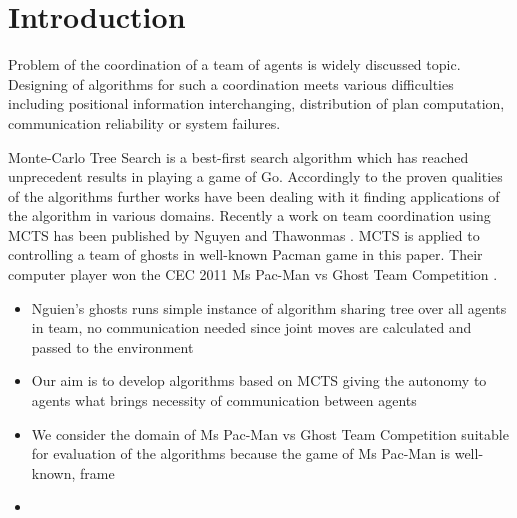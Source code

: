 \chapter*{Introduction}




Problem of the coordination of a team of agents is widely discussed topic.
Designing of algorithms for such a coordination meets various difficulties 
including positional information interchanging, distribution of plan computation, 
communication reliability or system failures.

Monte-Carlo Tree Search is a best-first search algorithm which has
reached unprecedent results in playing a game of Go.
Accordingly to the proven qualities of the algorithms further works have
been dealing with it finding applications of the algorithm in various
domains.
Recently a work on team coordination using MCTS has been published by
Nguyen and Thawonmas \cite{Nguyen2011}.
MCTS is applied to controlling a team of ghosts in well-known Pacman
game in this paper.
Their computer player won the CEC 2011 Ms Pac-Man vs Ghost Team
Competition \cite{PacmanVsGhosts}.

\begin{itemize}
\item Nguien's ghosts runs simple instance of algorithm sharing tree
over all agents in team, no communication needed since joint moves are
calculated and passed to the environment
\item Our aim is to develop algorithms based on MCTS giving the autonomy
to agents what brings necessity of communication between agents
\item We consider the domain of Ms Pac-Man vs Ghost Team Competition
suitable for evaluation of the algorithms because the game of Ms Pac-Man
is well-known, frame
\item
\end{itemize}



